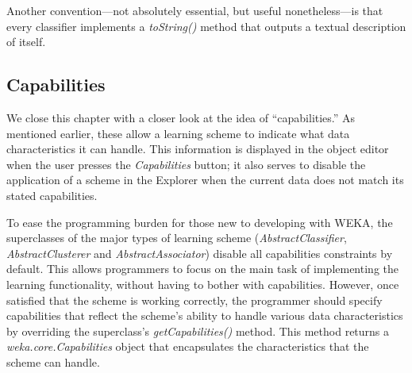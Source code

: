 Another convention---not absolutely essential, but useful
nonetheless---is that every classifier implements
a \textit{toString()} method that outputs a textual description of
itself.

\subsection{Capabilities}

We close this chapter with a closer look at the idea of
``capabilities.'' As mentioned earlier, these allow a learning scheme to
indicate what data characteristics it can handle. This information is
displayed in the object editor when the user presses the \textit{Capabilities}
button; it also serves to disable the application of a scheme in the
Explorer when the current data does not match its stated capabilities.

To ease the programming burden for those new to developing with WEKA,
the superclasses of the major types of learning scheme (\textit{AbstractClassifier},
\textit{AbstractClusterer} and \textit{AbstractAssociator}) disable all capabilities
constraints by default. This allows programmers to focus on the main
task of implementing the learning functionality, without having to
bother with capabilities. However, once satisfied that the scheme is
working correctly, the programmer should specify capabilities that
reflect the scheme's ability to handle various data characteristics by
overriding the superclass's {\em getCapabilities()} method. This method
returns a \textit{weka.core.Capabilities} object that encapsulates the
characteristics that the scheme can handle.

